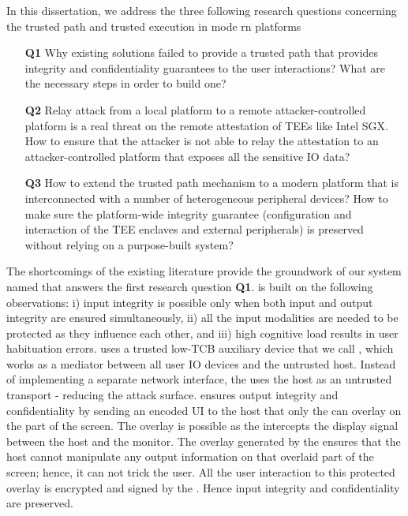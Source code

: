 In this dissertation, we address the three following research questions concerning the trusted path and trusted execution in mode rn platforms 
\begin{enumerate}
    \item[\textbf{Q1}] Why existing solutions failed to provide a trusted path that provides integrity and confidentiality guarantees to the user interactions? What are the necessary steps in order to build one?
    
    \item[\textbf{Q2}] Relay attack from a local platform to a remote attacker-controlled platform is a real threat on the remote attestation of TEEs like Intel SGX. How to ensure that the attacker is not able to relay the attestation to an attacker-controlled platform that exposes all the sensitive IO data?
    
    \item[\textbf{Q3}] How to extend the trusted path mechanism to a modern platform that is interconnected with a number of heterogeneous peripheral devices? How to make sure the platform-wide integrity guarantee (configuration and interaction of the TEE enclaves and external peripherals) is preserved without relying on a purpose-built system?  
\end{enumerate}


The shortcomings of the existing literature provide the groundwork of our system named \protection that answers the first research question \textbf{Q1}.
\protection is built on the following observations: i) input integrity is possible only when both input and output integrity are ensured simultaneously, ii) all the input modalities are needed to be protected as they influence each other, and iii) high cognitive load results in user habituation errors. \protection uses a trusted low-TCB auxiliary device that we call \deviceprotection, which works as a mediator between all user IO devices and the untrusted host. Instead of implementing a separate network interface, the \deviceprotection uses the host as an untrusted transport - reducing the attack surface. \protection ensures output integrity and confidentiality by sending an encoded UI to the host that only the \deviceprotection can overlay on the part of the screen. The overlay is possible as the \deviceprotection intercepts the display signal between the host and the monitor. The overlay generated by the \deviceprotection ensures that the host cannot manipulate any output information on that overlaid part of the screen; hence, it can not trick the user. All the user interaction to this protected overlay is encrypted and signed by the \deviceprotection. Hence input integrity and confidentiality are preserved.

